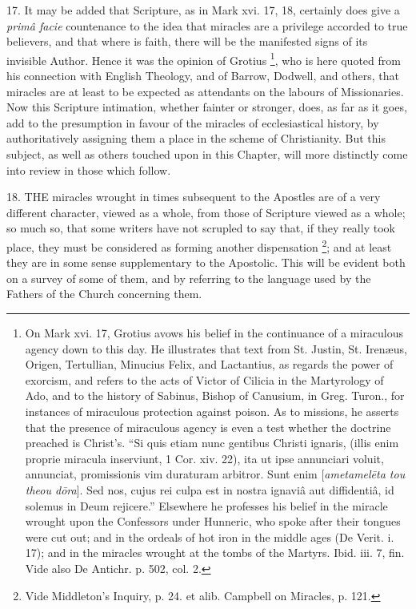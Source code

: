 17.
It may be added that Scripture, as in Mark xvi. 17, 18, certainly does
give a \emph{primâ facie} countenance to the idea that miracles are a
privilege accorded to true believers, and that where is faith, there
will be the manifested signs of its invisible Author. Hence it
was the opinion of Grotius \footnote{On Mark xvi. 17, Grotius avows his belief in the continuance of a
miraculous agency down to this day. He illustrates that text from St.
Justin, St. Irenæus, Origen, Tertullian, Minucius Felix, and
Lactantius, as regards the power of exorcism, and refers to the acts
of Victor of Cilicia in the Martyrology of Ado, and to the history of
Sabinus, Bishop of Canusium, in Greg. Turon., for instances of
miraculous protection against poison. As to missions, he asserts that
the presence of miraculous agency is even a test whether the doctrine
preached is Christ's. ``Si quis etiam nunc gentibus Christi ignaris,
(illis enim proprie miracula inserviunt, 1 Cor. xiv. 22), ita ut ipse
annunciari voluit, annunciat, promissionis vim duraturam arbitror.
Sunt enim [\emph{ametamel\={e}ta tou theou d\={o}ra}]. Sed nos,
cujus rei culpa est in nostra ignaviâ aut diffidentiâ, id solemus in
Deum rejicere.'' Elsewhere he professes his belief in the miracle
wrought upon the Confessors under Hunneric, who spoke after their
tongues were cut out; and in the ordeals of hot iron in the middle
ages (De Verit. i. 17); and in the miracles wrought at the tombs of the
Martyrs. Ibid. iii. 7, fin. Vide also De Antichr. p. 502, col. 2.},
who is here quoted from his connection with English Theology, and of
Barrow, Dodwell, and others, that miracles are at least to be expected
as attendants on the labours of Missionaries. Now this Scripture
intimation, whether fainter or stronger, does, as far as it goes, add
to the presumption in favour of the miracles of ecclesiastical
history, by authoritatively assigning them a place in the scheme of
Christianity. But this subject, as well as others touched upon in this
Chapter, will more distinctly come into review in those which follow.


18.
THE miracles wrought in times
subsequent to the Apostles are of a very different character, viewed
as a whole, from those of Scripture viewed as a whole; so much so,
that some writers have not scrupled to say that, if they really took
place, they must be considered as forming another dispensation \footnote{Vide Middleton's Inquiry, p. 24. et alib.
Campbell on Miracles, p. 121.}; and at least they are in some sense supplementary to the
Apostolic. This will be evident both on a survey of some of them, and
by referring to the language used by the Fathers of the Church
concerning them.

